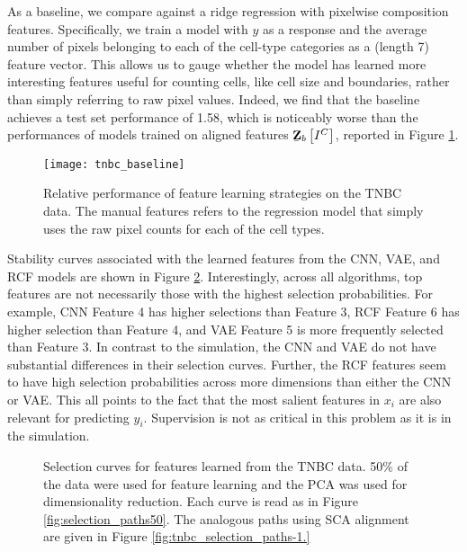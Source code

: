 As a baseline, we compare against a ridge regression with pixelwise composition
features. Specifically, we train a model with $y$ as a response and the average
number of pixels belonging to each of the cell-type categories as a (length 7)
feature vector. This allows us to gauge whether the model has learned more
interesting features useful for counting cells, like cell size and boundaries,
rather than simply referring to raw pixel values. Indeed, we find that the
baseline achieves a test set performance of 1.58, which is noticeably worse than
the performances of models trained on aligned features
$\underaccent{\bar}{\mathbf{Z}}_{b}\left[I^{C}\right]$, reported in Figure
\ref{fig:tnbc_baseline}.

\begin{figure}
  \centering
  \texttt{[image: tnbc\_baseline]}
  \caption{Relative performance of feature learning strategies on the TNBC data.
    The manual features refers to the regression model that simply uses the raw
    pixel counts for each of the cell types.}
  \label{fig:tnbc_baseline}
\end{figure}

Stability curves associated with the learned features from the CNN, VAE, and RCF
models are shown in Figure \ref{fig:tnbc_selection_paths-2}. Interestingly,
across all algorithms, top features are not necessarily those with the highest
selection probabilities. For example, CNN Feature 4 has higher selections than
Feature 3, RCF Feature 6 has higher selection than Feature 4, and VAE Feature 5
is more frequently selected than Feature 3. In contrast to the simulation, the
CNN and VAE do not have substantial differences in their selection curves.
Further, the RCF features seem to have high selection probabilities across more
dimensions than either the CNN or VAE. This all points to the fact that the most
salient features in $x_i$ are also relevant for predicting $y_i$. Supervision is
not as critical in this problem as it is in the simulation.

\begin{figure}
  \centering
  \caption{Selection curves for features learned from the TNBC data. 50\% of
    the data were used for feature learning and the PCA was used for
    dimensionality reduction. Each curve is read as in Figure
    \ref{fig:selection_paths50}. The analogous paths using SCA alignment are
    given in Figure \ref{fig:tnbc_selection_paths-1.}}
  \label{fig:tnbc_selection_paths-2}
\end{figure}


